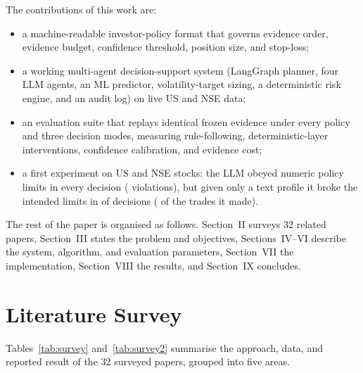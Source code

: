 The contributions of this work are:
\begin{itemize}
\item a machine-readable investor-policy format that governs evidence order, evidence budget, confidence threshold, position size, and stop-loss;
\item a working multi-agent decision-support system (LangGraph planner, four LLM agents, an ML predictor, volatility-target sizing, a deterministic risk engine, and an audit log) on live US and NSE data;
\item an evaluation suite that replays identical frozen evidence under every policy and three decision modes, measuring rule-following, deterministic-layer interventions, confidence calibration, and evidence cost;
\item a first experiment on \ObStocks{} US and NSE stocks: the LLM obeyed numeric policy limits in every decision (\ObExplicit{} violations), but given only a text profile it broke the intended limits in \ObNL{} of decisions (\ObNLacted{} of the trades it made).
\end{itemize}

The rest of the paper is organised as follows. Section~II surveys 32 related papers, Section~III states the problem and objectives, Sections~IV--VI describe the system, algorithm, and evaluation parameters, Section~VII the implementation, Section~VIII the results, and Section~IX concludes.

\section{Literature Survey}
Tables~\ref{tab:survey} and~\ref{tab:survey2} summarise the approach, data, and reported result of the 32 surveyed papers, grouped into five areas.

